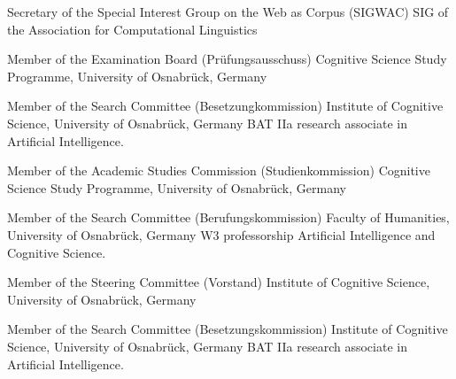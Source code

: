 
        {Secretary of the Special Interest Group on the Web as Corpus (SIGWAC)}
        {}
        {SIG of the Association for Computational Linguistics}
        {}
        {}

        {Member of the Examination Board (Pr\"{u}fungsausschuss)}
        {}
        {Cognitive Science Study Programme, University of Osnabr\"{u}ck, Germany}
        {}
        {}

        {Member of the Search Committee (Besetzungkommission)}
        {}
        {Institute of Cognitive Science, University of Osnabr\"{u}ck, Germany}
        {}
        {BAT IIa research associate in Artificial Intelligence.}

        {Member of the Academic Studies Commission (Studienkommission)}
        {}
        {Cognitive Science Study Programme, University of Osnabr\"{u}ck, Germany}
        {}
        {}

        {Member of the Search Committee (Berufungskommission)}
        {}
        {Faculty of Humanities, University of Osnabr\"{u}ck, Germany}
        {}
        {W3 professorship Artificial Intelligence and Cognitive Science.}

        {Member of the Steering Committee (Vorstand)}
        {}
        {Institute of Cognitive Science, University of Osnabr\"{u}ck, Germany}
        {}
        {}

        {Member of the Search Committee (Besetzungskommission)}
        {}
        {Institute of Cognitive Science, University of Osnabr\"{u}ck, Germany}
        {}
        {BAT IIa research associate in Artificial Intelligence.}


